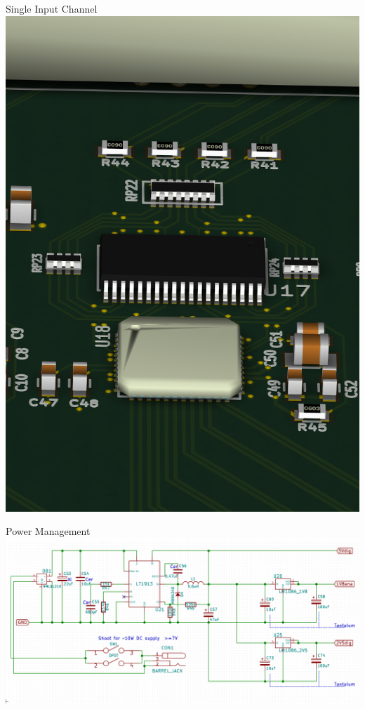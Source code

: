 \documentclass{beamer}
\begin{document}
\begin{frame}{Single Input Channel}
  \centering
  \includegraphics[height=\textheight]{figures/DAQCard2015_Single_Channel}
\end{frame}

\begin{frame}{Power Management}
  \centering
  \includegraphics[width=\textwidth]{figures/Power_Schem}
\end{frame}
\end{document}
